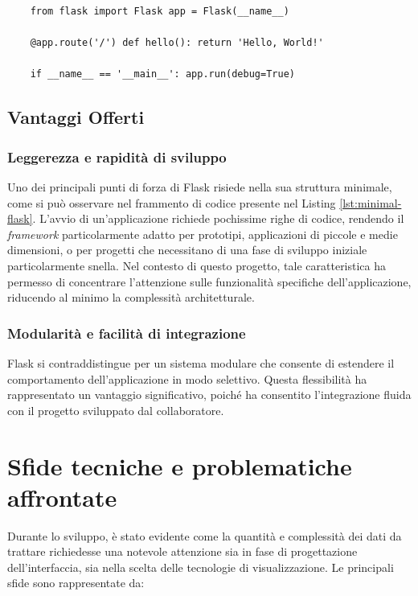 \begin{listing}
  [H]
  \caption{Codice che inizializza un'istanza minimale di Flask}
  \label{lst:minimal-flask} %
  \begin{verbatim}
    from flask import Flask app = Flask(__name__)

    @app.route('/') def hello(): return 'Hello, World!'

    if __name__ == '__main__': app.run(debug=True)
  \end{verbatim}
\end{listing}

\subsection{Vantaggi Offerti}
\subsubsection*{Leggerezza e rapidità di sviluppo}
Uno dei principali punti di forza di Flask risiede nella sua struttura minimale,
come si può osservare nel frammento di codice presente nel Listing \ref{lst:minimal-flask}.
L'avvio di un'applicazione richiede pochissime righe di codice, rendendo il \textit{framework}
particolarmente adatto per prototipi, applicazioni di piccole e medie dimensioni,
o per progetti che necessitano di una fase di sviluppo iniziale particolarmente
snella. Nel contesto di questo progetto, tale caratteristica ha permesso di
concentrare l'attenzione sulle funzionalità specifiche dell'applicazione, riducendo
al minimo la complessità architetturale.

\subsubsection*{Modularità e facilità di integrazione}
Flask si contraddistingue per un sistema modulare che consente di estendere il comportamento
dell'applicazione in modo selettivo. \cite{flask-docs} Questa flessibilità ha
rappresentato un vantaggio significativo, poiché ha consentito l'integrazione fluida
con il progetto sviluppato dal collaboratore.

\section{Sfide tecniche e problematiche affrontate}

Durante lo sviluppo, è stato evidente come la quantità e complessità dei dati da
trattare richiedesse una notevole attenzione sia in fase di progettazione dell'interfaccia,
sia nella scelta delle tecnologie di visualizzazione. Le principali sfide sono rappresentate
da:

